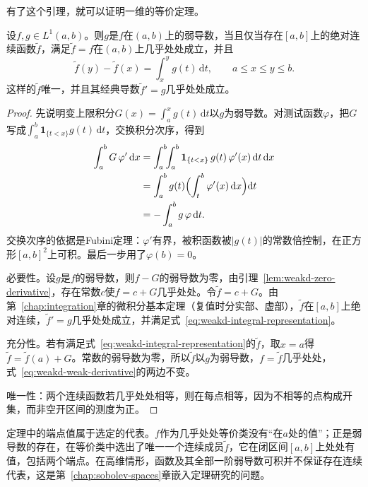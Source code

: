 有了这个引理，就可以证明一维的等价定理。

\begin{theorem}[一维弱导数与绝对连续代表]
\label{thm:weakd-absolute-continuity}
设$f,g\in L^1(a,b)$。则$g$是$f$在$(a,b)$上的弱导数，当且仅当存在$[a,b]$上的绝对连续函数$\tilde f$，满足$\tilde f=f$在$(a,b)$上几乎处处成立，并且
\begin{equation}
\tilde f(y)-\tilde f(x)=\int_x^yg(t)\,\mathrm dt ,\qquad a\leq x\leq y\leq b .
\label{eq:weakd-integral-representation}
\end{equation}
这样的$\tilde f$唯一，并且其经典导数$\tilde f'=g$几乎处处成立。
\end{theorem}

\begin{proof}
先说明变上限积分$G(x)=\int_a^xg(t)\,\mathrm dt$以$g$为弱导数。对测试函数$\varphi$，把$G$写成$\int_a^b\mathbf 1_{\{t<x\}}g(t)\,\mathrm dt$，交换积分次序，得到
\[
\begin{aligned}
\int_a^bG\,\varphi'\,\mathrm dx&=\int_a^b\!\!\int_a^b\mathbf 1_{\{t<x\}}\,g(t)\,\varphi'(x)\,\mathrm dt\,\mathrm dx\\
&=\int_a^bg(t)\Bigl(\int_t^b\varphi'(x)\,\mathrm dx\Bigr)\mathrm dt\\
&=-\int_a^bg\,\varphi\,\mathrm dt .
\end{aligned}
\]
交换次序的依据是Fubini定理：$\varphi'$有界，被积函数被$\lvert g(t)\rvert$的常数倍控制，在正方形$[a,b]^2$上可积。最后一步用了$\varphi(b)=0$。

必要性。设$g$是$f$的弱导数，则$f-G$的弱导数为零，由引理~\ref{lem:weakd-zero-derivative}，存在常数$c$使$f=c+G$几乎处处。令$\tilde f=c+G$。由第~\ref{chap:integration}章的微积分基本定理（复值时分实部、虚部），$\tilde f$在$[a,b]$上绝对连续，$\tilde f'=g$几乎处处成立，并满足式~\eqref{eq:weakd-integral-representation}。

充分性。若有满足式~\eqref{eq:weakd-integral-representation}的$\tilde f$，取$x=a$得$\tilde f=\tilde f(a)+G$。常数的弱导数为零，所以$\tilde f$以$g$为弱导数，$f=\tilde f$几乎处处，式~\eqref{eq:weakd-weak-derivative}的两边不变。

唯一性：两个连续函数若几乎处处相等，则在每点相等，因为不相等的点构成开集，而非空开区间的测度为正。
\end{proof}

定理中的端点值属于选定的代表。$f$作为几乎处处等价类没有“在$a$处的值”；正是弱导数的存在，在等价类中选出了唯一一个连续成员$\tilde f$，它在闭区间$[a,b]$上处处有值，包括两个端点。在高维情形，函数及其全部一阶弱导数可积并不保证存在连续代表，这是第~\ref{chap:sobolev-spaces}章嵌入定理研究的问题。

